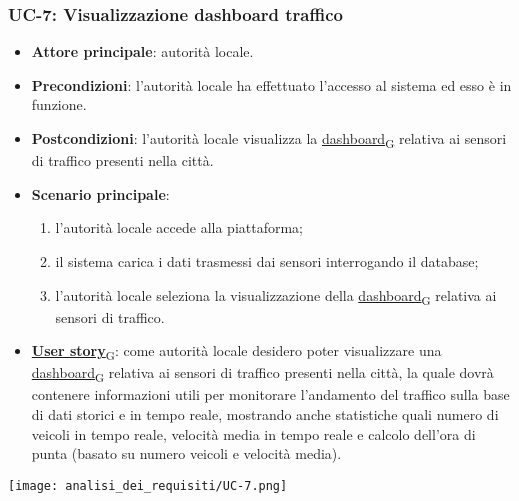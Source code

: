 \subsubsection{UC-7: Visualizzazione dashboard traffico}
\begin{itemize}
	\item \textbf{Attore principale}: autorità locale.
	\item \textbf{Precondizioni}: l'autorità locale ha effettuato l'accesso al sistema ed esso è in funzione.
	\item \textbf{Postcondizioni}: l'autorità locale visualizza la \href{https://7last.github.io/docs/pb/documentazione-interna/glossario\#dashboard}{dashboard\textsubscript{G}} relativa
	      ai sensori di traffico presenti nella città.
	\item \textbf{Scenario principale}:
	      \begin{enumerate}
		      \item l'autorità locale accede alla piattaforma;
		      \item il sistema carica i dati trasmessi dai sensori interrogando il database;
		      \item l'autorità locale seleziona la visualizzazione della \href{https://7last.github.io/docs/pb/documentazione-interna/glossario\#dashboard}{dashboard\textsubscript{G}} relativa ai sensori di traffico.
	      \end{enumerate}
	\item \href{https://7last.github.io/docs/pb/documentazione-interna/glossario\#user-story}{\textbf{User story}\textsubscript{G}}:
	      come autorità locale desidero poter visualizzare una \href{https://7last.github.io/docs/pb/documentazione-interna/glossario\#dashboard}{dashboard\textsubscript{G}} relativa ai sensori di traffico presenti nella città, la quale
	      dovrà contenere informazioni utili per monitorare l'andamento del traffico sulla base di dati storici e in tempo reale, mostrando
	      anche statistiche quali numero di veicoli in tempo reale, velocità media in tempo reale e calcolo dell'ora di punta (basato su numero veicoli e velocità media).
\end{itemize}
\begin{center}
	\texttt{[image: analisi\_dei\_requisiti/UC-7.png]}
\end{center}


